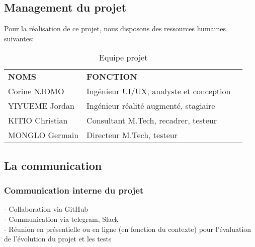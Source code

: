\subsection{Management du projet}
	Pour la réalisation de ce projet, nous disposons des ressources humaines suivantes: 
\begin{table}[H]
 \centering
	\caption{Equipe projet}
\begin{tabular}{|l|l|l}
\cline{1-2}
\textbf{NOMS}                         & \textbf{FONCTION}                                              & \cellcolor[HTML]{FFFFFF} \\ \cline{1-2}
{\color[HTML]{333333} Corine NJOMO}   & {\color[HTML]{333333} Ingénieur UI/UX, analyste et conception} &                          \\ \cline{1-2}
{\color[HTML]{333333} YIYUEME Jordan} & {\color[HTML]{333333} Ingénieur réalité augmenté, stagiaire}   &                          \\ \cline{1-2}
KITIO Christian                       & Consultant M.Tech, recadrer, testeur                           &                          \\ \cline{1-2}
MONGLO Germain                        & Directeur M.Tech, testeur                                      &                          \\ \cline{1-2}
\end{tabular}
\end{table}

\subsection{La communication}

\subsubsection{Communication interne du projet}
	- Collaboration via GitHub  \\
	- Communication via telegram, Slack \\
	- Réunion en présentielle ou en ligne (en fonction du contexte) pour l’évaluation de l’évolution du projet et les tests 


